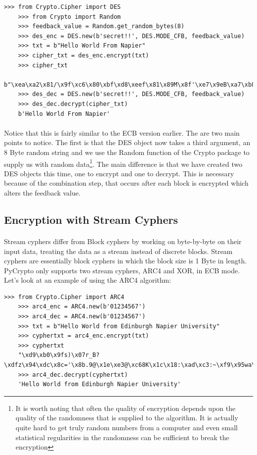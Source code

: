 \documentclass[12pt, a4paper, oneside]{book}
\begin{document}
{\begin{lstlisting}[style=DOS]
    >>> from Crypto.Cipher import DES
    >>> from Crypto import Random
    >>> feedback_value = Random.get_random_bytes(8)
    >>> des_enc = DES.new(b'secret!!', DES.MODE_CFB, feedback_value)
    >>> txt = b"Hello World From Napier"
    >>> cipher_txt = des_enc.encrypt(txt)
    >>> cipher_txt
    b"\xea\xa2\x81/\x9f\xc6\x80\xbf\xd8\xeef\x81\x89M\x8f'\xe7\x9eB\xa7\xb8\xd7\xd6"
    >>> des_dec = DES.new(b'secret!!', DES.MODE_CFB, feedback_value)
    >>> des_dec.decrypt(cipher_txt)
    b'Hello World From Napier'
\end{lstlisting}


\paragraph{} Notice that this is fairly similar to the ECB version earlier. The are two main points to notice. The first is that the DES object now takes a third argument, an 8 Byte random string and we use the Random function of the Crypto package to supply us with random data\footnote{It is worth noting that often the quality of encryption depends upon the quality of the randomness that is supplied to the algorithm. It is actually quite hard to get truly random numbers from a computer and even small statistical regularities in the randomness can be sufficient to break the encryption}. The main difference is that we have created two DES objects this time, one to encrypt and one to decrypt. This is necessary because of the combination step, that occurs after each block is encrypted which alters the feedback value.

\subsection{Encryption with Stream Cyphers}
\paragraph{} Stream cyphers differ from Block cyphers by working on byte-by-byte on their input data, treating the data as a stream instead of discrete blocks. Stream cyphers are essentially block cyphers in which the block size is 1 Byte in length. PyCrypto only supports two stream cyphers, ARC4 and XOR, in ECB mode. Let's look at an example of using the ARC4 algorithm:

\begin{lstlisting}[style=DOS]
    >>> from Crypto.Cipher import ARC4
    >>> arc4_enc = ARC4.new(b'01234567')
    >>> arc4_dec = ARC4.new(b'01234567')
    >>> txt = b"Hello World from Edinburgh Napier University"
    >>> cyphertxt = arc4_enc.encrypt(txt)
    >>> cyphertxt
    "\xd9\xb0\x9fs)\x07r_B?\xdfz\x94\xdc\x8c='\x8b.9@\x1e\xe3@\xc68K\x1c\x18:\xad\xc3:~\xf9\x95wa\xbcB\xa0U\x08\xe9"
    >>> arc4_dec.decrypt(cyphertxt)
    'Hello World from Edinburgh Napier University'
\end{lstlisting}


}
\end{document}
